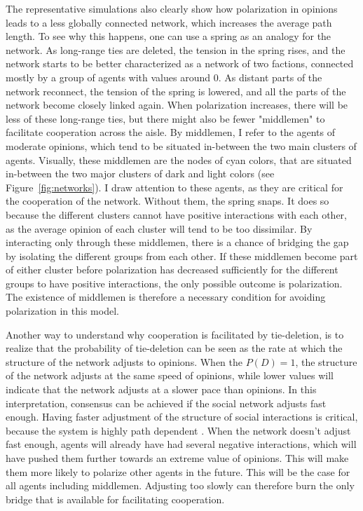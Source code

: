 \documentclass[11pt]{article}
\begin{document}
\noindent The representative simulations also clearly show how polarization in opinions leads to a less globally connected network, which increases the average path length. To see why this happens, one can use a spring as an analogy for the network. As long-range ties are deleted, the tension in the spring rises, and the network starts to be better characterized as a network of two factions, connected mostly by a group of agents with values around 0. As distant parts of the network reconnect, the tension of the spring is lowered, and all the parts of the network become closely linked again. When polarization increases, there will be less of these long-range ties, but there might also be fewer "middlemen" to facilitate cooperation across the aisle. By middlemen, I refer to the agents of moderate opinions, which tend to be situated in-between the two main clusters of agents. Visually, these middlemen are the nodes of cyan colors, that are situated in-between the two major clusters of dark and light colors (see Figure~\ref{fig:networks}). I draw attention to these agents, as they are critical for the cooperation of the network. Without them, the spring snaps. It does so because the different clusters cannot have positive interactions with each other, as the average opinion of each cluster will tend to be too dissimilar. By interacting only through these middlemen, there is a chance of bridging the gap by isolating the different groups from each other. If these middlemen become part of either cluster before polarization has decreased sufficiently for the different groups to have positive interactions, the only possible outcome is polarization. The existence of middlemen is therefore a necessary condition for avoiding polarization in this model. 

\noindent Another way to understand why cooperation is facilitated by tie-deletion, is to realize that the probability of tie-deletion can be seen as the rate at which the structure of the network adjusts to opinions. When the $P(D) = 1$, the structure of the network adjusts at the same speed of opinions, while lower values will indicate that the network adjusts at a slower pace than opinions. In this interpretation, consensus can be achieved if the social network adjusts fast enough. Having faster adjustment of the structure of social interactions is critical, because the system is highly path dependent \cite{turner_paths_2018, macy2021polarization}.  When the network doesn't adjust fast enough, agents will already have had several negative interactions, which will have pushed them further towards an extreme value of opinions. This will make them more likely to polarize other agents in the future. This will be the case for all agents including middlemen. Adjusting too slowly can therefore burn the only bridge that is available for facilitating cooperation.  
\end{document}
